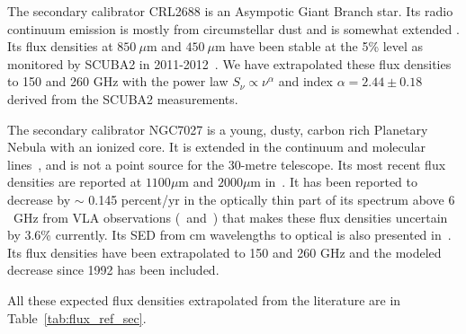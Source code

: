
The secondary calibrator CRL2688 is an Asympotic Giant Branch
star. Its radio continuum emission is mostly from circumstellar dust
and is somewhat extended \cite{Knapp}.  Its flux densities at
$850\ \mu$m and $450 \ \mu$m have been stable at the 5\% level as
monitored by SCUBA2 in 2011-2012~\cite{Dempsey}.
We have extrapolated these flux densities to 150 and 260 GHz
with the power law $S_{\nu} \propto \nu^{\alpha}$ and index
$\alpha=2.44\pm0.18$ derived from the SCUBA2 measurements.


The secondary calibrator NGC7027 is a young, dusty, carbon rich
Planetary Nebula with an ionized core.  It is extended in the
continuum and molecular lines~\cite{Bieging1991}, and is not a point
source for the 30-metre telescope.  Its most recent flux densities are
reported at $1100\mu$m and $2000\mu$m in~\cite{Hoare1992}. It has
been reported to decrease by $\sim$ 0.145 percent/yr in the optically
thin part of its spectrum above $6$~GHz from VLA
observations (\cite{Zijlstra2008}~and~\cite{Hafez2008}) that makes
these flux densities uncertain by 3.6\% currently. Its SED from cm
wavelengths to optical is also presented in~\cite{Hafez2008}.
Its flux densities have been extrapolated to 150 and 260 GHz and the
modeled decrease since 1992 has been included.

All these expected flux densities extrapolated from the literature are in Table~\ref{tab:flux_ref_sec}.


